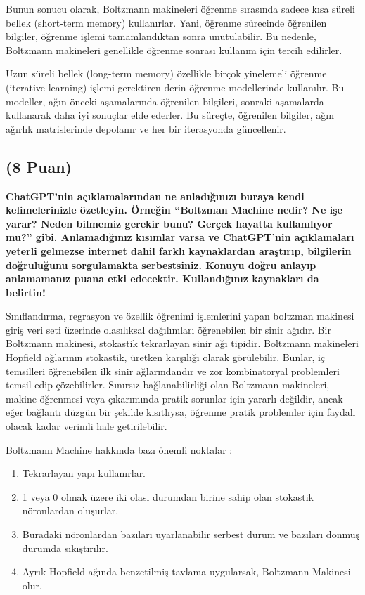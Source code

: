 \documentclass[11pt]{article}
\begin{document}
Bunun sonucu olarak, Boltzmann makineleri öğrenme sırasında sadece kısa süreli bellek (short-term memory) kullanırlar. Yani, öğrenme sürecinde öğrenilen bilgiler, öğrenme işlemi tamamlandıktan sonra unutulabilir. Bu nedenle, Boltzmann makineleri genellikle öğrenme sonrası kullanım için tercih edilirler.

Uzun süreli bellek (long-term memory) özellikle birçok yinelemeli öğrenme (iterative learning) işlemi gerektiren derin öğrenme modellerinde kullanılır. Bu modeller, ağın önceki aşamalarında öğrenilen bilgileri, sonraki aşamalarda kullanarak daha iyi sonuçlar elde ederler. Bu süreçte, öğrenilen bilgiler, ağın ağırlık matrislerinde depolanır ve her bir iterasyonda güncellenir.



\subsection{(8 Puan)} \textbf{ChatGPT’nin açıklamalarından ne anladığınızı buraya kendi kelimelerinizle özetleyin. Örneğin ``Boltzman Machine nedir? Ne işe yarar? Neden bilmemiz gerekir bunu? Gerçek hayatta kullanılıyor mu?'' gibi. Anlamadığınız kısımlar varsa ve ChatGPT’nin açıklamaları yeterli gelmezse internet dahil farklı kaynaklardan araştırıp, bilgilerin doğruluğunu sorgulamakta serbestsiniz. Konuyu doğru anlayıp anlamamanız puana etki edecektir. Kullandığınız kaynakları da belirtin!}

Sınıflandırma, regrasyon ve özellik öğrenimi işlemlerini yapan boltzman makinesi giriş veri seti üzerinde olasılıksal dağılımları öğrenebilen bir sinir ağıdır. Bir Boltzmann makinesi, stokastik tekrarlayan sinir ağı tipidir. Boltzmann makineleri Hopfield ağlarının stokastik, üretken karşılığı olarak görülebilir. Bunlar, iç temsilleri öğrenebilen ilk sinir ağlarındandır ve zor kombinatoryal problemleri temsil edip çözebilirler. Sınırsız bağlanabilirliği olan Boltzmann makineleri, makine öğrenmesi veya çıkarımında pratik sorunlar için yararlı değildir, ancak eğer bağlantı düzgün bir şekilde kısıtlıysa, öğrenme pratik problemler için faydalı olacak kadar verimli hale getirilebilir.

Boltzmann Machine hakkında bazı önemli noktalar :
\begin{enumerate}
\item Tekrarlayan yapı kullanırlar.
\item 1 veya 0 olmak üzere iki olası durumdan birine sahip olan stokastik nöronlardan oluşurlar.
\item Buradaki nöronlardan bazıları uyarlanabilir serbest durum
  ve bazıları donmuş durumda sıkıştırılır.
  \item Ayrık Hopfield ağında benzetilmiş tavlama uygularsak, Boltzmann Makinesi olur.
\end{enumerate}
\end{document}
